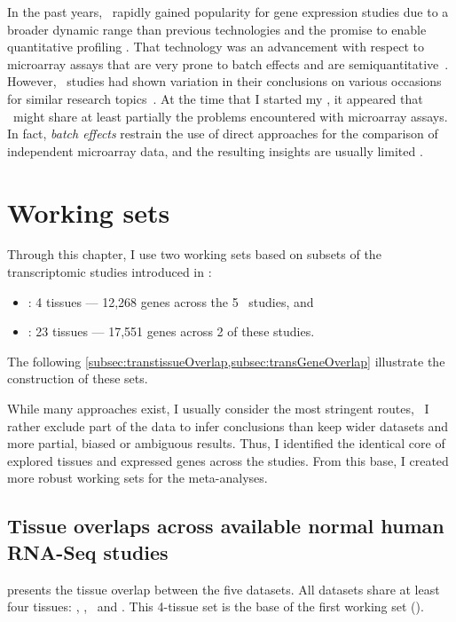 In the past years,
\Rnaseq\ rapidly gained popularity
for gene expression studies
due to a broader dynamic range than previous technologies
and the promise to enable quantitative profiling .
That technology was an advancement with respect to microarray assays
that are very prone to batch effects and are semiquantitative~.
However, \Rnaseq\ studies had shown variation in their conclusions on various
occasions for similar research topics~.
At the time that I started my \phd,
it appeared that
\Rnaseq\ might share at least partially the problems encountered
with microarray assays.
In fact, \emph{batch effects} restrain the use of direct approaches
for the comparison of independent microarray data,
and the resulting insights are usually limited .

\section{Working sets}

Through this chapter, I use two working sets
based on subsets of the transcriptomic studies introduced in :
\begin{itemize}[topsep=0pt,nosep]
    \item \setOne: 4 tissues --- 12,268 genes across the 5 \Rnaseq\ studies, and
    \item \setTwo: 23 tissues --- 17,551 genes across 2 of these studies.
\end{itemize}

The following \cref{subsec:transtissueOverlap,subsec:transGeneOverlap}
illustrate the construction of these sets.

While many approaches exist,
I usually consider the most stringent routes,
\ie\ I rather exclude part of the data to infer conclusions than
keep wider datasets and more partial, biased or ambiguous results.
Thus, I identified the identical core of
explored tissues and expressed genes across the studies.
From this base, I created more robust working sets for the meta-analyses.

\subsection{Tissue overlaps across available normal human RNA-Seq studies \quad}%
\label{subsec:transtissueOverlap}
\vspace*{-5mm}
 presents the tissue overlap between the five datasets.
All datasets share at least four tissues:
\heart, \kidney, \liver\ and \testis.
This 4-tissue set is the base of the first working set (\setOne).

